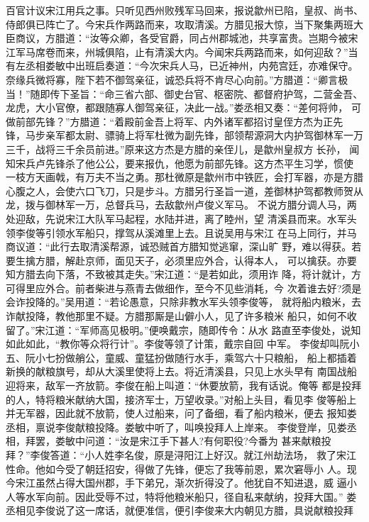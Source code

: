 百官计议宋江用兵之事。只听见西州败残军马回来，报说歙州已陷，皇叔、尚书、
侍郎俱已阵亡了。今宋兵作两路而来，攻取清溪。方腊见报大惊，当下聚集两班大
臣商议，方腊道：“汝等众卿，各受官爵，同占州郡城池，共享富贵。岂期今被宋
江军马席卷而来，州城俱陷，止有清溪大内。今闻宋兵两路而来，如何迎敌？”当
有左丞相娄敏中出班启奏道：“今次宋兵人马，已近神州，内苑宫廷，亦难保守。
奈缘兵微将寡，陛下若不御驾亲征，诚恐兵将不肯尽心向前。”方腊道：“卿言极
当！”随即传下圣旨：“命三省六部、御史台官、枢密院、都督府护驾，二营金吾、
龙虎，大小官僚，都跟随寡人御驾亲征，决此一战。”娄丞相又奏：“差何将帅，
可做前部先锋？”方腊道：“着殿前金吾上将军、内外诸军都招讨皇侄方杰为正先
锋，马步亲军都太尉、骠骑上将军杜微为副先锋，部领帮源洞大内护驾御林军一万
三千，战将三千余员前进。”原来这方杰是方腊的亲侄儿，是歙州皇叔方长孙，
闻知宋兵卢先锋杀了他公公，要来报仇，他愿为前部先锋。这方杰平生习学，惯使
一枝方天画戟，有万夫不当之勇。那杜微原是歙州市中铁匠，会打军器，亦是方腊
心腹之人，会使六口飞刀，只是步斗。方腊另行圣旨一道，差御林护驾都教师贺从
龙，拨与御林军一万，总督兵马，去敌歙州卢俊义军马。
不说方腊分调人马，两处迎敌，先说宋江大队军马起程，水陆并进，离了睦州，望
清溪县而来。水军头领李俊等引领水军船只，撑驾从溪滩里上去。且说吴用与宋江
在马上同行，并马商议道：“此行去取清溪帮源，诚恐贼首方腊知觉逃窜，深山旷
野，难以得获。若要生擒方腊，解赴京师，面见天子，必须里应外合，认得本人，
可以擒获。亦要知方腊去向下落，不致被其走失。”宋江道：“是若如此，须用诈
降，将计就计，方可得里应外合。前者柴进与燕青去做细作，至今不见些消耗，今
次着谁去好?须是会诈投降的。”吴用道：“若论愚意，只除非教水军头领李俊等，
就将船内粮米，去诈献投降，教他那里不疑。方腊那厮是山僻小人，见了许多粮米
船只，如何不收留了。”宋江道：“军师高见极明。”便唤戴宗，随即传令：从水
路直至李俊处，说知如此如此，“教你等众将行计”。李俊等领了计策，戴宗自回
中军。
李俊却叫阮小五、阮小七扮做艄公，童威、童猛扮做随行水手，乘驾六十只粮船，
船上都插着新换的献粮旗号，却从大溪里使将上去。将近清溪县，只见上水头早有
南国战船迎将来，敌军一齐放箭。李俊在船上叫道：“休要放箭，我有话说。俺等
都是投拜的人，特将粮米献纳大国，接济军士，万望收录。”对船上头目，看见李
俊等船上并无军器，因此就不放箭，使人过船来，问了备细，看了船内粮米，便去
报知娄丞相，禀说李俊献粮投降。娄敏中听了，叫唤投拜人上岸来。
李俊登岸，见娄丞相，拜罢，娄敏中问道：“汝是宋江手下甚人?有何职役?今番为
甚来献粮投拜？”李俊答道：“小人姓李名俊，原是浔阳江上好汉。就江州劫法场，
救了宋江性命。他如今受了朝廷招安，得做了先锋，便忘了我等前恩，累次窘辱小
人。现今宋江虽然占得大国州郡，手下弟兄，渐次折得没了。他犹自不知进退，威
逼小人等水军向前。因此受辱不过，特将他粮米船只，径自私来献纳，投拜大国。”
娄丞相见李俊说了这一席话，就便准信，便引李俊来大内朝见方腊，具说献粮投拜

